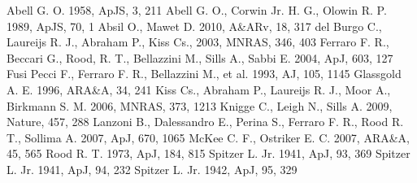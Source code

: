 \begin{thebibliography}{99}



 Abell
  G. O. 1958, ApJS, 3, 211
 Abell G. O., Corwin Jr. H. G., Olowin
  R. P. 1989, ApJS, 70, 1
 Absil
  O., Mawet D. 2010, A\&ARv, 18, 317
  del Burgo C., Laureijs R. J., Abraham P., Kiss Cs., 2003, MNRAS,
  346, 403
  Ferraro F. R., Beccari G., Rood, R. T., Bellazzini M., Sills A.,
  Sabbi E. 2004, ApJ, 603, 127
  Fusi Pecci F., Ferraro F. R., Bellazzini M., et al. 1993, AJ, 105,
  1145
  Glassgold A. E. 1996, ARA\&A, 34, 241
 Kiss Cs.,
  Abraham P., Laureijs R. J., Moor A., Birkmann S. M. 2006, MNRAS,
  373, 1213
 Knigge C., Leigh N., Sills A. 2009,
  Nature, 457, 288
  Lanzoni B., Dalessandro E., Perina S., Ferraro F. R., Rood R. T.,
  Sollima A. 2007, ApJ, 670, 1065
  McKee C. F., Ostriker E. C. 2007, ARA\&A, 45, 565
 Rood
  R. T. 1973, ApJ, 184, 815
  Spitzer L. Jr. 1941, ApJ, 93, 369
  Spitzer L. Jr. 1941, ApJ, 94, 232
  Spitzer L. Jr. 1942, ApJ, 95, 329

\end{thebibliography}


\label{lastpage}
